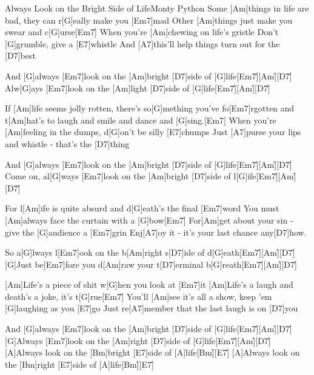 \documentclass[../main.tex]{subfiles}
\begin{document}
\begin{song}{Always Look on the Bright Side of Life}{Monty Python}{}        
Some [Am]things in life are bad, they can r[G]eally make you [Em7]mad
Other [Am]things just make you swear and c[G]urse[Em7]{\h}      
When you're [Am]chewing on life's gristle
Don't [G]grumble, give a [E7]whistle
And [A7]this'll help things turn out for the [D7]best
 
And [G]always [Em7]look on the [Am]bright [D7]side of [G]life[Em7]{\h}[Am]{\h}[D7]{\h}
Alw[G]ays [Em7]look on the [Am]light [D7]side of [G]life[Em7]{\h}[Am]{\h}[D7]{\h}
 
If [Am]life seems jolly rotten, there's so[G]mething you've fo[Em7]rgotten
and t[Am]hat's to laugh and smile and dance and [G]sing.[Em7]{\hspace{12mm}}
When you're [Am]feeling in the dumps, d[G]on't be silly [E7]chumps
Just [A7]purse your lips and whistle - that's the [D7]thing
 
And [G]always [Em7]look on the [Am]bright [D7]side of [G]life[Em7]{\h}[Am]{\h}[D7]{\h}
Come on, al[G]ways [Em7]look on the [Am]bright [D7]side of l[G]ife[Em7]{\h}[Am]{\h}[D7]{\h}
 
For l[Am]ife is quite absurd and d[G]eath's the final [Em7]word
You must [Am]always face the curtain with a [G]bow[Em7]{\h}    
For[Am]get about your sin - give the [G]audience a [Em7]grin
Enj[A7]oy it - it's your last chance any[D7]how.
 
So a[G]lways l[Em7]ook on the b[Am]right s[D7]ide of d[G]eath[Em7]{\h}[Am]{\h}[D7]{\h}
[G]Just be[Em7]fore you d[Am]raw your t[D7]erminal b[G]reath[Em7]{\h}[Am]{\h}[D7]{\h}

[Am]Life's a piece of shit   w[G]hen you look at [Em7]it
[Am]Life's a laugh and death's a joke, it's t[G]rue[Em7]{\h}
You'll [Am]see it's all a show,
keep 'em [G]laughing as you [E7]go
Just re[A7]member that the last laugh is on [D7]you

And [G]always [Em7]look on the [Am]bright [D7]side of [G]life[Em7]{\h}[Am]{\h}[D7]{\h}
[G]Always [Em7]look on the [Am]right [D7]side of [G]life[Em7]{\h}[Am]{\h}[D7]{\h}
[A]Always look on the [Bm]bright [E7]side of [A]life[Bm]{\h}[E7]{\h}
[A]Always look on the [Bm]right [E7]side of [A]life[Bm]{\h}[E7]{\h}


\end{song}
\end{document}
